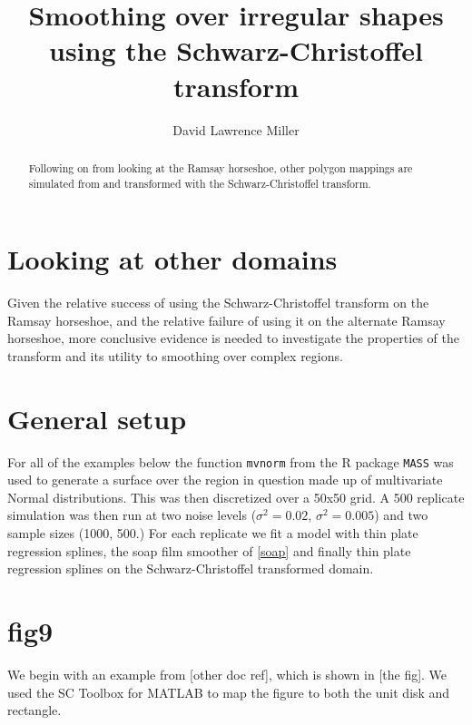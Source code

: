 \documentclass[a4paper,10pt]{amsart}
\title{Smoothing over irregular shapes using the Schwarz-Christoffel transform}
\author{David Lawrence Miller}
\newcommand{\sch}{Schwarz-Christoffel }
\begin{document}
\begin{abstract}
Following on from looking at the Ramsay horseshoe, other polygon mappings are simulated from and transformed with the \sch transform.
\end{abstract}


\newtheorem{thm}{Theorem}[section]

\newtheorem{defn}{Definition}[section]

\maketitle



\section{Looking at other domains}

Given the relative success of using the \sch transform on the Ramsay horseshoe, and the relative failure of using it on the alternate Ramsay horseshoe, more conclusive evidence is needed to investigate the properties of the transform and its utility to smoothing over complex regions.





\section{General setup}

For all of the examples below the function \texttt{mvnorm} from the \textsf{R} package \texttt{MASS} was used to generate a surface over the region in question made up of multivariate Normal distributions. This was then discretized over a 50x50 grid. A 500 replicate simulation was then run at two noise levels ($\sigma^2=0.02$, $\sigma^2=0.005$) and two sample sizes (1000, 500.) For each replicate we fit a model with thin plate regression splines, the soap film smoother of \ref{soap} and finally thin plate regression splines on the \sch transformed domain.






\section{fig9}

We begin with an example from [other doc ref], which is shown in [the fig]. We used the SC Toolbox for MATLAB to map the figure to both the unit disk and rectangle.
\end{document}
